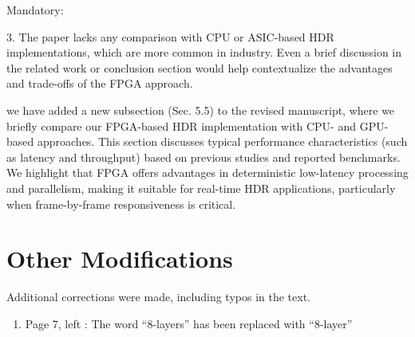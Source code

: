 \documentclass[a4j]{jsarticle}
\begin{document}
\vspace{0.3cm}
\begin{screen}
Mandatory:

3. The paper lacks any comparison with CPU or ASIC-based HDR implementations, which are more common in industry. Even a brief discussion in the related work or conclusion section would help contextualize the advantages and trade-offs of the FPGA approach.
\end{screen}
we have added a new subsection (Sec. 5.5) to the revised manuscript, 
where we briefly compare our FPGA-based HDR implementation 
with CPU- and GPU-based approaches.
This section discusses typical performance characteristics (such as latency and 
throughput) based on previous studies and reported benchmarks. 
We highlight that FPGA offers advantages in deterministic low-latency processing 
and parallelism, making it suitable for real-time HDR applications, 
particularly when frame-by-frame responsiveness is critical.


\section*{Other Modifications}
Additional corrections were made, including typos in the text.

\begin{enumerate}
  \item Page 7, left : The word ``8-layers'' has been replaced with ``8-layer''
\end{enumerate}
\end{document}
